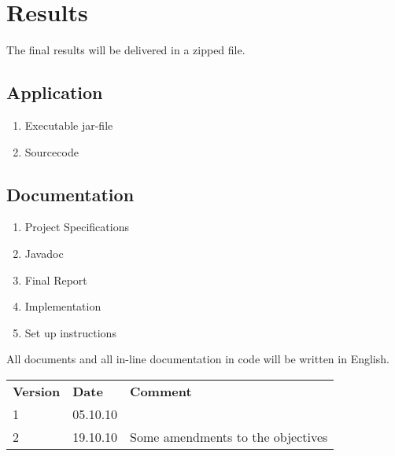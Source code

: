 \documentclass[a4paper,10pt,titlepage]{article}
\begin{document}
\section{Results}

The final results will be delivered in a zipped file.

\subsection{Application}
\begin{enumerate}
 \item Executable jar-file
 \item Sourcecode
\end{enumerate}

\subsection{Documentation}
\begin{enumerate}
 \item Project Specifications
 \item Javadoc
 \item Final Report
 \item Implementation
 \item Set up instructions
\end{enumerate}

All documents and all in-line documentation in code will be written in English.


\newpage
\begin{tabularx}{\textwidth}{p{2cm} p{2cm} X}
\textbf{Version} & \textbf{Date} & \textbf{Comment}\\
1 & 05.10.10 & \\
2 & 19.10.10 & Some amendments to the objectives\\
\end{tabularx}
\end{document}
